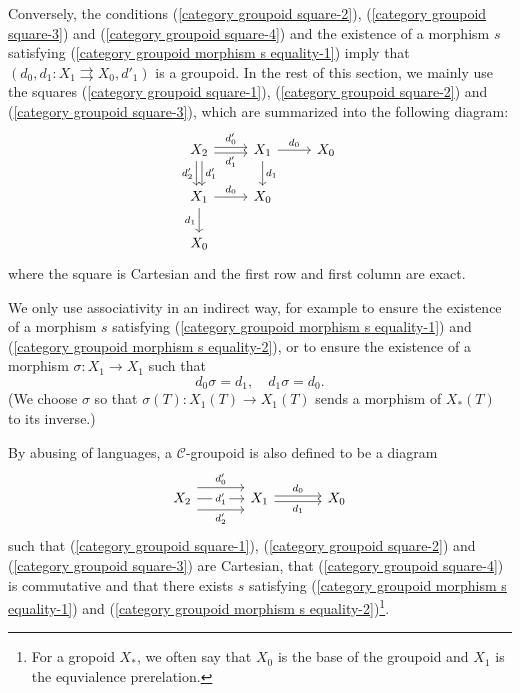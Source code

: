 Conversely, the conditions (\ref{category groupoid square-2}), (\ref{category groupoid square-3}) and (\ref{category groupoid square-4}) and the existence of a morphism $s$ satisfying (\ref{category groupoid morphism s equality-1}) imply that $(d_0,d_1:X_1\rightrightarrows X_0,d'_1)$ is a groupoid. In the rest of this section, we mainly use the squares (\ref{category groupoid square-1}), (\ref{category groupoid square-2}) and (\ref{category groupoid square-3}), which are summarized into the following diagram:
\begin{equation}\label{category groupoid commutative diagram}
\begin{tikzcd}
X_2\ar[r,shift left=2pt,"d_0'"]\ar[r,shift right=2pt,swap,"d_1'"]\ar[d,shift left=2pt,"d_1'"]\ar[d,shift right=2pt,swap,"d_2'"]&X_1\ar[r,"d_0"]\ar[d,"d_1"]&X_0\\
X_1\ar[d,swap,"d_1"]\ar[r,"d_0"]&X_0\\
X_0
\end{tikzcd}
\end{equation}
where the square is Cartesian and the first row and first column are exact.\par
We only use associativity in an indirect way, for example to ensure the existence of a morphism $s$ satisfying (\ref{category groupoid morphism s equality-1}) and (\ref{category groupoid morphism s equality-2}), or to ensure the existence of a morphism $\sigma:X_1\to X_1$ such that
\begin{equation}\label{category groupoid morphism sigma equality}
d_0\sigma=d_1,\quad d_1\sigma=d_0.
\end{equation}
(We choose $\sigma$ so that $\sigma(T):X_1(T)\to X_1(T)$ sends a morphism of $X_*(T)$ to its inverse.)\par
By abusing of languages, a $\mathcal{C}$-groupoid is also defined to be a diagram
\[\begin{tikzcd}[column sep=12mm]
X_2\ar[r,shift left=8pt,"d_0'"]\ar[r,shift right=8pt,swap,"d_2'"]\ar[r,"d_1'"description]&X_1\ar[r,shift left=2pt,"d_0"]\ar[r,shift right=2pt,swap,"d_1"]&X_0
\end{tikzcd}\]
such that (\ref{category groupoid square-1}), (\ref{category groupoid square-2}) and (\ref{category groupoid square-3}) are Cartesian, that (\ref{category groupoid square-4}) is commutative and that there exists $s$ satisfying (\ref{category groupoid morphism s equality-1}) and (\ref{category groupoid morphism s equality-2})\footnote{For a gropoid $X_*$, we often say that $X_0$ is the base of the groupoid and $X_1$ is the equvialence prerelation.}.

